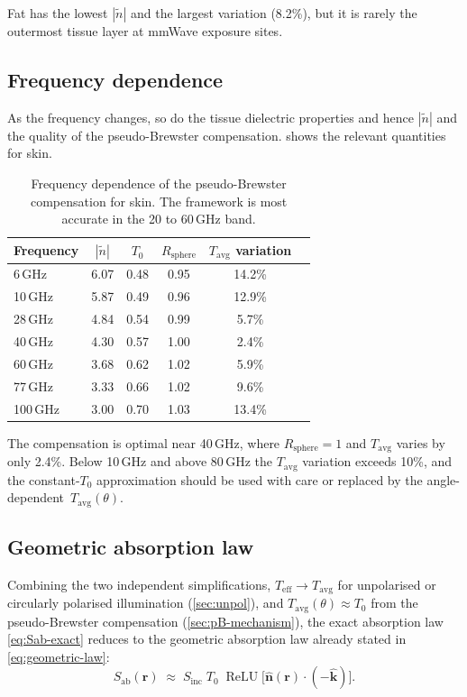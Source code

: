 \documentclass[11pt,a4paper]{article}
\theoremstyle{definition}      %
\newcommand{\khat}{\hat{\bm{k}}}
\newcommand{\nhat}{\hat{\bm{n}}}
\newcommand{\rr}{\mathbf{r}}
\newcommand{\Sinc}{S_{\mathrm{inc}}}
\newcommand{\Sab}{S_{\mathrm{ab}}}
\newcommand{\Teff}{T_{\mathrm{eff}}}
\newcommand{\Tavg}{T_{\mathrm{avg}}}
\newcommand{\ntilde}{\tilde{n}}
\DeclareMathOperator{\ReLU}{ReLU}
\begin{document}
Fat has the lowest $|\ntilde|$ and the largest variation (8.2\%), but
it is rarely the outermost tissue layer at mmWave exposure sites.

\subsection{Frequency dependence}\label{sec:freq-dep}

As the frequency changes, so do the tissue dielectric properties and
hence $|\ntilde|$ and the quality of the pseudo-Brewster compensation.
 shows the relevant quantities for skin.

\begin{table}[!htbp]
\centering
\caption{Frequency dependence of the pseudo-Brewster compensation for
  skin.  The framework is most accurate in the 20 to 60\,GHz band.}
\label{tab:freq}
\begin{tabular}{lccccc}
\toprule
Frequency & $|\ntilde|$ & $T_0$ & $R_{\mathrm{sphere}}$
  & $\Tavg$ variation \\
\midrule
6\,GHz   & 6.07 & 0.48 & 0.95 & 14.2\% \\
10\,GHz  & 5.87 & 0.49 & 0.96 & 12.9\% \\
28\,GHz  & 4.84 & 0.54 & 0.99 & 5.7\%  \\
40\,GHz  & 4.30 & 0.57 & 1.00 & 2.4\%  \\
60\,GHz  & 3.68 & 0.62 & 1.02 & 5.9\%  \\
77\,GHz  & 3.33 & 0.66 & 1.02 & 9.6\%  \\
100\,GHz & 3.00 & 0.70 & 1.03 & 13.4\% \\
\bottomrule
\end{tabular}
\end{table}

The compensation is optimal near 40\,GHz, where $R_{\mathrm{sphere}}=1$
and $\Tavg$ varies by only 2.4\%.  Below 10\,GHz and above 80\,GHz
the $\Tavg$ variation exceeds 10\%, and the constant-$T_0$
approximation should be used with care or replaced by the
angle-dependent~$\Tavg(\theta)$.

\subsection{Geometric absorption law}\label{sec:geometric-law}

Combining the two independent simplifications, $\Teff\to\Tavg$ for
unpolarised or circularly polarised illumination
(\cref{sec:unpol}), and $\Tavg(\theta)\approx T_0$ from the
pseudo-Brewster compensation (\cref{sec:pB-mechanism}), the
exact absorption law \cref{eq:Sab-exact} reduces to the
geometric absorption law already stated in
\cref{eq:geometric-law}:
\begin{equation*}
  \Sab(\rr) \;\approx\; \Sinc\;T_0\;\ReLU\!\bigl[\nhat(\rr)\cdot(-\khat)\bigr].
\end{equation*}
\end{document}
